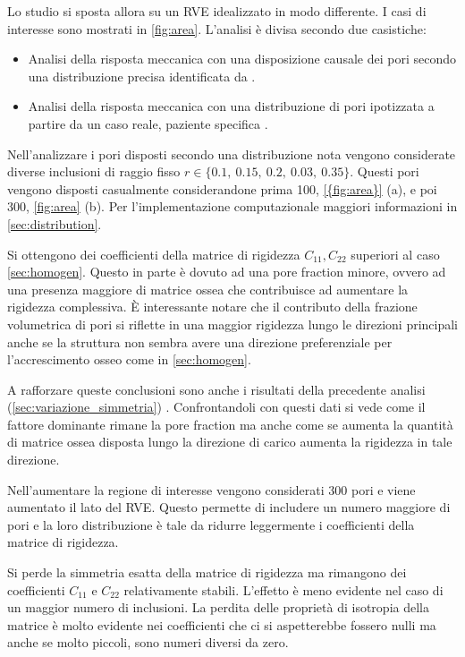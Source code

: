\documentclass[a4paper,num-refs]{oup-contemporary}
\begin{document}
Lo studio si sposta allora su un RVE idealizzato in modo differente. I casi di interesse sono mostrati in \cref{fig:area}. L'analisi è divisa secondo due casistiche: 
\begin{itemize}
\item Analisi della risposta meccanica con una disposizione causale dei pori secondo una distribuzione precisa identificata da \citet{Doktor:2011}. 
\item Analisi della risposta meccanica con una distribuzione di pori ipotizzata a partire da un caso reale, paziente specifica \citep{ESA:2005}.
\end{itemize}

Nell'analizzare i pori disposti secondo una distribuzione nota vengono considerate diverse inclusioni di raggio fisso $r\in \{0.1,\: 0.15,\: 0.2,\:0.03,\: 0.35\}$. Questi pori vengono disposti casualmente considerandone prima 100, \cref{{fig:area}} (a), e poi 300, \cref{fig:area} (b). Per l'implementazione computazionale maggiori informazioni in \cref{sec:distribution}.

Si ottengono dei coefficienti della matrice di rigidezza $C_{11},C_{22}$ superiori al caso \cref{sec:homogen}. Questo in parte è dovuto ad una pore fraction minore, ovvero ad una presenza maggiore di matrice ossea che contribuisce ad aumentare la rigidezza complessiva. È interessante notare che il contributo della frazione volumetrica di pori si riflette in una maggior rigidezza lungo le direzioni principali anche se la struttura non sembra avere una direzione preferenziale per l'accrescimento osseo come in \cref{sec:homogen}.

A rafforzare queste conclusioni sono anche i risultati della precedente analisi (\cref{sec:variazione_simmetria}) . Confrontandoli con questi dati si vede come il fattore dominante rimane la pore fraction ma anche come se aumenta la quantità di matrice ossea disposta lungo la direzione di carico aumenta la rigidezza in tale direzione. 

Nell'aumentare la regione di interesse vengono considerati 300 pori e viene aumentato il lato del RVE. Questo permette di includere un numero maggiore di pori e la loro distribuzione è tale da ridurre leggermente i coefficienti della matrice di rigidezza. 

Si perde la simmetria esatta della matrice di rigidezza ma rimangono dei coefficienti $C_{11}$ e $C_{22}$ relativamente stabili. L'effetto è meno evidente nel caso di un maggior numero di inclusioni. La perdita delle proprietà di isotropia della matrice è molto evidente nei coefficienti che ci si aspetterebbe fossero nulli ma anche se molto piccoli, sono numeri diversi da zero. 
\end{document}
